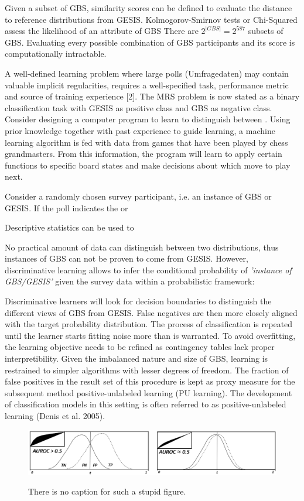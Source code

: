 Given a subset of GBS, similarity scores can be defined to evaluate the distance to reference distributions from GESIS. Kolmogorov-Smirnov tests or Chi-Squared assess the likelihood of an attribute of GBS  There are \(2^{|GBS|} = 2^{587}\) subsets of GBS. Evaluating every possible combination of GBS participants and its score is computationally intractable.

A well-deﬁned learning problem where large polls (Umfragedaten) may contain valuable implicit regularities, requires a well-speciﬁed task, performance metric and source of training experience [2]. The MRS problem is now stated as a binary classification task with GESIS as positive class and GBS as negative class. Consider designing a computer program to learn to distinguish between . Using prior knowledge together with past experience to guide learning, a machine learning algorithm
is fed with data from games that have been played by chess grandmasters. From this information, the program will learn to apply certain functions to speciﬁc board states and make decisions about which move to play next.

Consider a randomly chosen survey participant, i.e. an instance of GBS or GESIS. If the poll indicates the or

Descriptive statistics can be used to 
 
No practical amount of data can distinguish between two distributions, thus instances of GBS can not be proven to come from GESIS. However, discriminative learning allows to infer the conditional probability of \textit{'instance of GBS/GESIS'} given the survey data within a probabilistic framework:

Discriminative learners will look for decision boundaries to distinguish the different views of GBS from GESIS. False negatives are then more closely aligned with the target probability distribution. The process of classification is repeated until the learner starts fitting noise more than is warranted. To avoid overfitting, the learning objective needs to be refined as contingency tables lack proper interpretibility. Given the imbalanced nature and size of GBS, learning is restrained to simpler algorithms with lesser degrees of freedom. The fraction of false positives in the result set of this procedure is kept as proxy measure for the subsequent method positive-unlabeled learning (PU learning). The development of classiﬁcation models in this setting is often referred to as positive-unlabeled learning (Denis et al. 2005).

\vspace{15pt}
\begin{figure}[ht]
	\begin{center}
		\includegraphics[scale=0.48,angle=0]{fig/roc_example}
		\label{project}
		\caption{There is no caption for such a stupid figure.}
	\end{center}
\end{figure}

